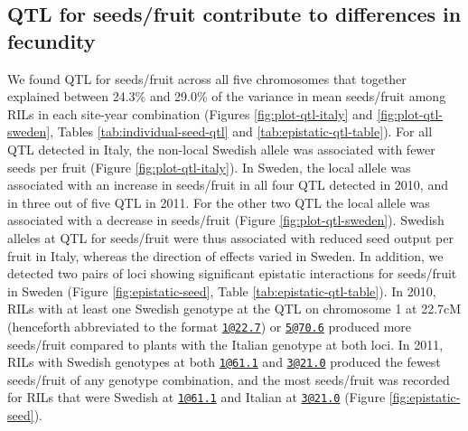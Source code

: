 \documentclass[]{article}
\begin{document}
\hypertarget{qtl-for-seedsfruit-contribute-to-differences-in-fecundity}{%
\subsection{QTL for seeds/fruit contribute to differences in fecundity}\label{qtl-for-seedsfruit-contribute-to-differences-in-fecundity}}

We found QTL for seeds/fruit across all five chromosomes that together explained between 24.3\% and 29.0\% of the variance in mean seeds/fruit among RILs in each site-year combination (Figures \ref{fig:plot-qtl-italy} and \ref{fig:plot-qtl-sweden}, Tables \ref{tab:individual-seed-qtl} and \ref{tab:epistatic-qtl-table}). For all QTL detected in Italy, the non-local Swedish allele was associated with fewer seeds per fruit (Figure \ref{fig:plot-qtl-italy}). In Sweden, the local allele was associated with an increase in seeds/fruit in all four QTL detected in 2010, and in three out of five QTL in 2011. For the other two QTL the local allele was associated with a decrease in seeds/fruit (Figure \ref{fig:plot-qtl-sweden}). Swedish alleles at QTL for seeds/fruit were thus associated with reduced seed output per fruit in Italy, whereas the direction of effects varied in Sweden. In addition, we detected two pairs of loci showing significant epistatic interactions for seeds/fruit in Sweden (Figure \ref{fig:epistatic-seed}, Table \ref{tab:epistatic-qtl-table}). In 2010, RILs with at least one Swedish genotype at the QTL on chromosome 1 at 22.7cM (henceforth abbreviated to the format \href{mailto:1@22.7}{\nolinkurl{1@22.7}}) or \href{mailto:5@70.6}{\nolinkurl{5@70.6}} produced more seeds/fruit compared to plants with the Italian genotype at both loci. In 2011, RILs with Swedish genotypes at both \href{mailto:1@61.1}{\nolinkurl{1@61.1}} and \href{mailto:3@21.0}{\nolinkurl{3@21.0}} produced the fewest seeds/fruit of any genotype combination, and the most seeds/fruit was recorded for RILs that were Swedish at \href{mailto:1@61.1}{\nolinkurl{1@61.1}} and Italian at \href{mailto:3@21.0}{\nolinkurl{3@21.0}} (Figure \ref{fig:epistatic-seed}).
\end{document}
